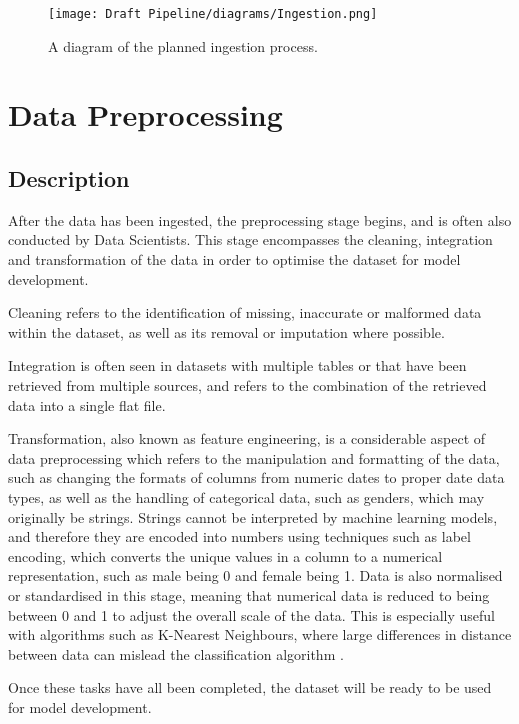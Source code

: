 \begin{figure}[H]
    \centering
    \texttt{[image: Draft Pipeline/diagrams/Ingestion.png]}
    \caption{A diagram of the planned ingestion process.}
    \label{fig:IngestionDiagram}
\end{figure}

\pagebreak %

\section{Data Preprocessing}\label{sec:Preprocessing}
\subsection{Description}
After the data has been ingested, the preprocessing stage begins, and is often also conducted by 
Data Scientists. This stage encompasses the
cleaning, integration and transformation of the data in order to optimise the dataset for model development.

Cleaning refers to the identification of missing, inaccurate or malformed data within the dataset,
as well as its removal or imputation where possible.

Integration is often seen in datasets with multiple tables or that have been retrieved from multiple sources,
and refers to the combination of the retrieved data into a single flat file. 

Transformation, also known as feature engineering, is a considerable aspect of data preprocessing
which refers to the manipulation and formatting of the data, such as changing the formats of columns 
from numeric dates to proper date data types, as well as the handling of categorical data, such as genders, 
which may originally be strings. Strings cannot be interpreted by machine learning models, and therefore they 
are encoded into numbers using techniques such as label encoding, which converts the unique values in a column
to a numerical representation, such as male being 0 and female being 1. Data is also normalised or standardised 
in this stage, meaning that numerical data is reduced to being between 0 and 1 to adjust the overall scale of the 
data. This is especially useful with algorithms such as K-Nearest Neighbours, where large differences in distance 
between data can mislead the classification algorithm \autocite{ibm_what_2021}.

Once these tasks have all been completed, the dataset will be ready to be used for model development.

